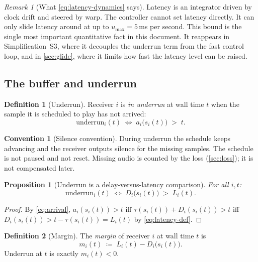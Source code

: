 \documentclass[11pt, a4paper]{article}
\theoremstyle{definition}
\newtheorem{definition}{Definition}[section]
\newtheorem{convention}{Convention}[section]
\theoremstyle{plain}
\newtheorem{proposition}[theorem]{Proposition}
\theoremstyle{remark}
\newtheorem{remark}{Remark}[section]
\begin{document}
\begin{remark}[What \cref{eq:latency-dynamics} says]
Latency is an integrator driven by clock drift and steered by warp.  The
controller cannot set latency directly.  It can only slide latency around
at up to $u_{\max} = 5$\,ms per second.  This bound is the single most
important quantitative fact in this document.  It reappears in
Simplification~S3, where it decouples the underrun term from the fast
control loop, and in \cref{sec:glide}, where it limits how fast the
latency level can be raised.
\end{remark}

\subsection{The buffer and underrun}\label{sec:buffer}

\begin{definition}[Underrun]\label{def:underrun}
Receiver $i$ is \emph{in underrun} at wall time $t$ when the sample it is
scheduled to play has not arrived:
\begin{equation}\label{eq:underrun-def}
  \text{underrun}_i(t)
  \;\iff\;
  a_i\!\bigl(s_i(t)\bigr) \;>\; t .
\end{equation}
\end{definition}

\begin{convention}[Silence convention]\label{conv:silence}
During underrun the schedule keeps advancing and the receiver outputs
silence for the missing samples.  The schedule is not paused and not
reset.  Missing audio is counted by the loss (\cref{sec:loss}); it is not
compensated later.
\end{convention}

\begin{proposition}[Underrun is a delay-versus-latency comparison]
\label{prop:underrun-margin}
For all $i, t$:
\begin{equation}\label{eq:underrun-margin}
  \text{underrun}_i(t)
  \;\iff\;
  D_i\!\bigl(s_i(t)\bigr) \;>\; L_i(t).
\end{equation}
\end{proposition}

\begin{proof}
By \cref{eq:arrival}, $a_i(s_i(t)) > t$ iff
$\tau(s_i(t)) + D_i(s_i(t)) > t$ iff
$D_i(s_i(t)) > t - \tau(s_i(t)) = L_i(t)$ by \cref{eq:latency-def}.
\end{proof}

\begin{definition}[Margin]\label{def:margin}
The \emph{margin} of receiver $i$ at wall time $t$ is
\begin{equation}\label{eq:margin-def}
  m_i(t) \;\coloneqq\; L_i(t) - D_i\!\bigl(s_i(t)\bigl).
\end{equation}
Underrun at $t$ is exactly $m_i(t) < 0$.
\end{definition}
\end{document}

